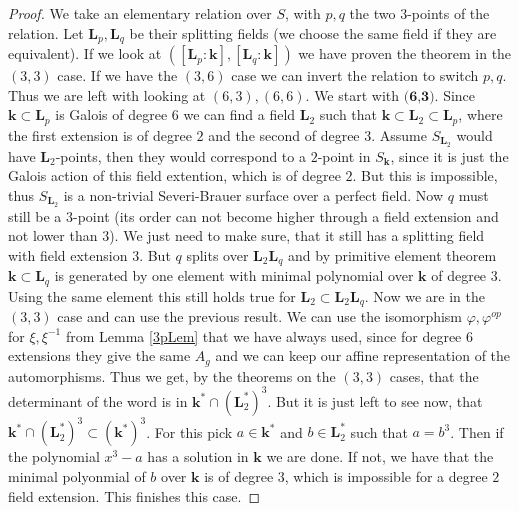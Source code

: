 \documentclass[12pt, oneside, reqno]{amsart}
\begin{document}
\begin{proof}
     We take an elementary relation over $S$, with $p,q$ the two $3$-points of the relation. Let $\textbf{L}_p, \textbf{L}_q$ be their splitting fields (we choose the same field if they are equivalent). If we look at $([\textbf{L}_p:\textbf{k}], [\textbf{L}_q:\textbf{k}])$ we have proven the theorem in the $(3,3)$ case. If we have the $(3,6)$ case we can invert the relation to switch $p,q$. Thus we are left with looking at $(6,3),(6,6)$. 
    \newline
    We start with $\textbf{(6,3)}$. Since $\textbf{k} \subset \textbf{L}_p$ is Galois of degree $6$ we can find a field $\textbf{L}_2$ such that $\textbf{k} \subset \textbf{L}_2 \subset \textbf{L}_p$, where the first extension is of degree $2$ and the second of degree $3$. Assume $S_{\textbf{L}_2}$ would have $\textbf{L}_2$-points, then they would correspond to a $2$-point in $S_{\textbf{k}}$, since it is just the Galois action of this field extention, which is of degree $2$. But this is impossible, thus $S_{\textbf{L}_2}$ is a non-trivial Severi-Brauer surface over a perfect field. Now $q$ must still be a $3$-point (its order can not become higher through a field extension and not lower than $3$). We just need to make sure, that it still has a splitting field with field extension $3$. But $q$ splits over $\textbf{L}_2 \textbf{L}_q$ and by primitive element theorem $\textbf{k} \subset \textbf{L}_q$ is generated by one element with minimal polynomial over $\textbf{k}$ of degree $3$. Using the same element this still holds true for $\textbf{L}_2 \subset\textbf{L}_2 \textbf{L}_q$. Now we are in the $(3,3)$ case and can use the previous result. We can use the isomorphism $\varphi, \varphi^{op}$ for $\xi,\xi^{-1}$ from Lemma \ref{3pLem} that we have always used, since for degree $6$ extensions they give the same $A_g$ and we can keep our affine representation of the automorphisms. Thus we get, by the theorems on the $(3,3)$ cases, that the determinant of the word is in $\textbf{k}^* \cap (\textbf{L}_2^{*})^3$. But it is just left to see now, that $\textbf{k}^* \cap (\textbf{L}_2^{*})^3 \subset (\textbf{k}^{*})^3$. For this pick $a \in \textbf{k}^*$ and $b \in \textbf{L}_2^*$ such that $a = b^3$. Then if the polynomial $x^3 - a$ has a solution in $\textbf{k}$ we are done. If not, we have that the minimal polyonmial of $b$ over $\textbf{k}$ is of degree $3$, which is impossible for a degree $2$ field extension. This finishes this case.
    \newline

\end{proof}
\end{document}

